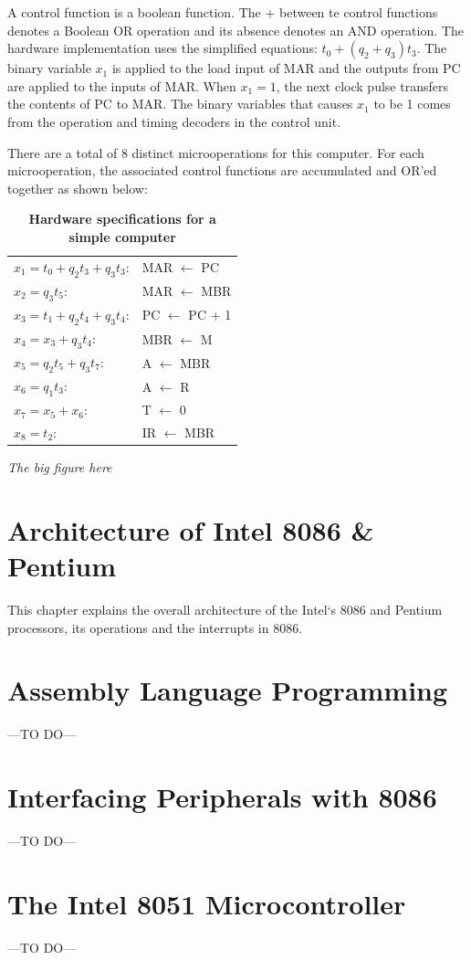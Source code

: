 \documentclass{book}
\begin{document}
A control function is a boolean function. The + between te control functions denotes a Boolean OR operation and its absence denotes an AND operation. The hardware implementation uses the simplified equations: $t_0 + (q_2 + q_3)t_3$. The binary variable $x_1$ is applied to the load input of MAR and the outputs from PC are applied to the inputs of MAR. When $x_1 = 1$, the next clock pulse transfers the contents of PC to MAR. The binary variables that causes $x_1$ to be 1 comes from the operation and timing decoders in the control unit.

There are a total of 8 distinct microoperations for this computer. For each microoperation, the associated control functions are accumulated and OR'ed together as shown below:

\begin{table}[h,c]

\begin{center}
 \begin{tabular}{l  l}
  \hline
  $x_1 = t_0 + q_2t_3 + q_3t_3$: & MAR $\leftarrow$ PC\\
  $x_2 = q_3t_5$: & MAR $\leftarrow$ MBR\\
  $x_3 = t_1 + q_2t_4 + q_3t_4$: & PC $\leftarrow$ PC + 1\\
  $x_4 = x_3 + q_3t_4$: & MBR $\leftarrow$ M\\
  $x_5 = q_2t_5 + q_3t_7$: & A $\leftarrow$ MBR\\
  $x_6 = q_1t_3$: & A $\leftarrow$ R\\
  $x_7 = x_5 + x_6$: & T $\leftarrow$ 0\\
  $x_8 = t_2$: & IR $\leftarrow$ MBR\\
  
	
  \hline
  \end{tabular}
  \caption{\textbf{Hardware specifications for a simple computer}}
  \label{control_design}
 \end{center}
\end{table}

  {\color{red} \textit{\huge The big figure here} }


\chapter{Architecture of Intel 8086 \& Pentium}
This chapter explains the overall architecture of the Intel`s 8086 and Pentium
processors, its operations and
the interrupts in 8086.


\chapter{Assembly Language Programming}
---TO DO---
\chapter{Interfacing Peripherals with 8086}
---TO DO---
\chapter{The Intel 8051 Microcontroller}
---TO DO---
\end{document}
